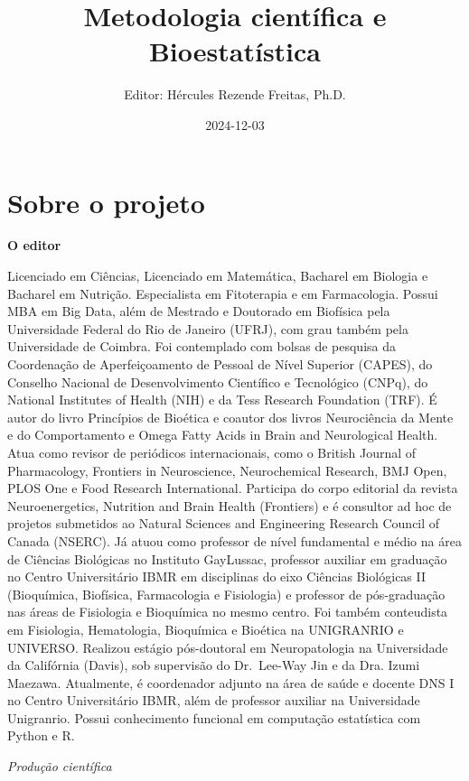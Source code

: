 \documentclass[
]{book}
\title{Metodologia científica e Bioestatística}
\author{Editor: Hércules Rezende Freitas, Ph.D.}
\date{2024-12-03}
\begin{document}
\maketitle

{
\setcounter{tocdepth}{1}
\tableofcontents
}
\chapter{Sobre o projeto}\label{sobre-o-projeto}

\textbf{O editor}

Licenciado em Ciências, Licenciado em Matemática, Bacharel em Biologia e Bacharel em Nutrição. Especialista em Fitoterapia e em Farmacologia. Possui MBA em Big Data, além de Mestrado e Doutorado em Biofísica pela Universidade Federal do Rio de Janeiro (UFRJ), com grau também pela Universidade de Coimbra. Foi contemplado com bolsas de pesquisa da Coordenação de Aperfeiçoamento de Pessoal de Nível Superior (CAPES), do Conselho Nacional de Desenvolvimento Científico e Tecnológico (CNPq), do National Institutes of Health (NIH) e da Tess Research Foundation (TRF). É autor do livro Princípios de Bioética e coautor dos livros Neurociência da Mente e do Comportamento e Omega Fatty Acids in Brain and Neurological Health. Atua como revisor de periódicos internacionais, como o British Journal of Pharmacology, Frontiers in Neuroscience, Neurochemical Research, BMJ Open, PLOS One e Food Research International. Participa do corpo editorial da revista Neuroenergetics, Nutrition and Brain Health (Frontiers) e é consultor ad hoc de projetos submetidos ao Natural Sciences and Engineering Research Council of Canada (NSERC). Já atuou como professor de nível fundamental e médio na área de Ciências Biológicas no Instituto GayLussac, professor auxiliar em graduação no Centro Universitário IBMR em disciplinas do eixo Ciências Biológicas II (Bioquímica, Biofísica, Farmacologia e Fisiologia) e professor de pós-graduação nas áreas de Fisiologia e Bioquímica no mesmo centro. Foi também conteudista em Fisiologia, Hematologia, Bioquímica e Bioética na UNIGRANRIO e UNIVERSO. Realizou estágio pós-doutoral em Neuropatologia na Universidade da Califórnia (Davis), sob supervisão do Dr.~Lee-Way Jin e da Dra. Izumi Maezawa. Atualmente, é coordenador adjunto na área de saúde e docente DNS I no Centro Universitário IBMR, além de professor auxiliar na Universidade Unigranrio. Possui conhecimento funcional em computação estatística com Python e R.

\emph{Produção científica}
\end{document}
